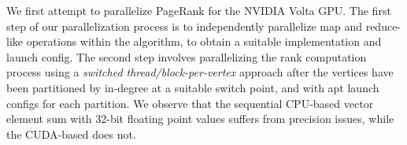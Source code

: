 We first attempt to parallelize PageRank for the NVIDIA Volta GPU. The first step of our parallelization process is to independently parallelize map and reduce-like operations within the algorithm, to obtain a suitable implementation and launch config. The second step involves parallelizing the rank computation process using a \emph{switched thread/block-per-vertex} approach after the vertices have been partitioned by in-degree at a suitable switch point, and with apt launch configs for each partition. We observe that the sequential CPU-based vector element sum with 32-bit floating point values suffers from precision issues, while the CUDA-based does not.

% 


